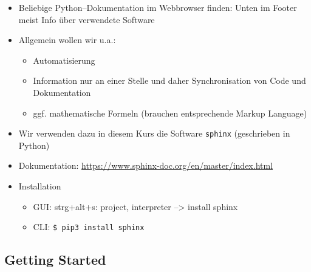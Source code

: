 \begin{itemize}
	\item
	      Beliebige Python--Dokumentation im Webbrowser finden: Unten im Footer meist Info über verwendete Software
	\item
	      Allgemein wollen wir u.a.:
	      \begin{itemize}
		      \item
		            Automatisierung
		      \item
		            Information nur an einer Stelle und daher Synchronisation von Code und Dokumentation
		      \item ggf. mathematische Formeln (brauchen entsprechende Markup Language)
	      \end{itemize}
	\item Wir verwenden dazu in diesem Kurs die Software \texttt{sphinx} (geschrieben in Python)
	\item	Dokumentation: \url{https://www.sphinx-doc.org/en/master/index.html}
	\item	Installation
	      \begin{itemize}
		      \item
		            GUI: strg+alt+s: project, interpreter --\textgreater{} install
		            sphinx
		      \item
		            CLI: \texttt{\$ pip3 install sphinx}
	      \end{itemize}
\end{itemize}

\hypertarget{getting-started}{%
	\subsection{\texorpdfstring{Getting
			Started}{Getting Started}}\label{getting-started}}

